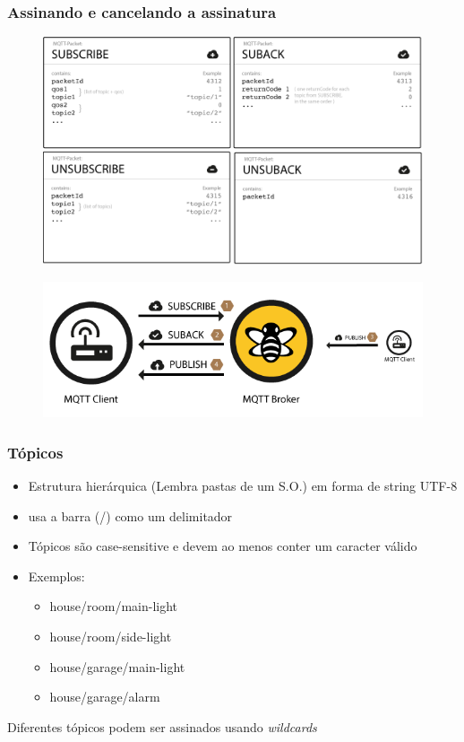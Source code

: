 \documentclass{beamer}
\begin{document}
\begin{frame}
\frametitle{Assinando e cancelando a assinatura}

\begin{figure}
\centering
\includegraphics[scale=0.25]{MQTT-SUBUNSUB}
\end{figure}

\begin{figure}
\centering
\includegraphics[scale=0.3]{MQTT-SubPubFlow}
\end{figure}

\end{frame}


\begin{frame}
\frametitle{Tópicos}
\begin{itemize}
\item Estrutura hierárquica (Lembra pastas de um S.O.) em forma de string UTF-8
\item usa a barra (/) como um delimitador
\item Tópicos são case-sensitive e devem ao menos conter um caracter válido
\item Exemplos:
\begin{itemize}
\item house/room/main-light
\item house/room/side-light
\item house/garage/main-light
\item house/garage/alarm
\end{itemize}
\end{itemize}

\begin{block}{}
Diferentes tópicos podem ser assinados usando  \emph{wildcards}
\end{block}

\end{frame}
\end{document}
